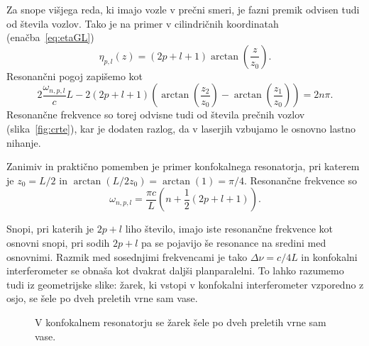 Za snope višjega reda, ki imajo vozle v prečni smeri, je fazni premik
odvisen tudi od števila vozlov. Tako je na primer v cilindričnih koordinatah
(enačba~\ref{eq:etaGL})
\begin{equation}
\eta_{p,l}(z)=(2p+l+1)\arctan\left(\frac{z}{z_{0}}\right).
\end{equation}
Resonančni pogoj zapišemo kot
\begin{equation}
2\frac{\omega_{n,p,l}}{c}L-2(2p+l+1)\left(\arctan\left(\frac{z_{2}}{z_{0}}\right)-
\arctan\left(\frac{z_{1}}{z_{0}}\right)\right)=2n\pi.
\end{equation}
Resonančne frekvence so torej odvisne tudi od števila prečnih vozlov (slika~\ref{fig:crte}),
kar je dodaten razlog, da v laserjih vzbujamo le osnovno lastno nihanje.

Zanimiv in praktično pomemben je primer konfokalnega resonatorja,
pri katerem je $z_{0}=L/2$ in $\arctan(L/2z_{0})= \arctan(1)=\pi/4$. Resonančne frekvence
so 
\begin{equation}
\omega_{n,p,l}=\frac{\pi c}{L}\left(n+\frac{1}{2}(2p+l+1)\right).
\label{eq:omega_konf}
\end{equation}

Snopi, pri katerih je $2p+l$ liho število, imajo iste resonančne frekvence kot
osnovni snopi, pri sodih $2p+l$ pa se pojavijo še resonance na sredini
med osnovnimi. Razmik med sosednjimi frekvencami je tako $\Delta\nu=c/4L$
in konfokalni interferometer se obnaša kot dvakrat daljši planparalelni.
To lahko razumemo tudi iz geometrijske slike: žarek, ki vstopi v konfokalni
interferometer vzporedno z osjo, se šele po dveh preletih vrne sam
vase.

\begin{figure}[h]
\centering
\def\svgwidth{55truemm} 

\caption{V konfokalnem resonatorju se žarek šele po dveh preletih
vrne sam vase.}
\label{fig:Konfokalni_zarek}
\end{figure}

